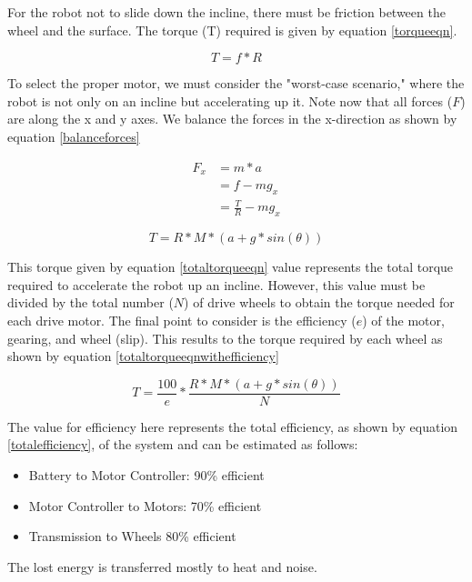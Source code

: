 For the robot not to slide down the incline, there must be friction between the wheel and the surface. 
The torque (T) required is given by equation \ref{torqueeqn}.

\begin{equation} \label{torqueeqn}
T = f * R
\end{equation}

To select the proper motor, we must consider the "worst-case scenario," where the robot is not only on an incline but accelerating up it.
Note now that all forces ($F$) are along the x and y axes. We balance the forces in the x-direction as shown by equation \ref{balanceforces}

\begin{equation} \label{balanceforces}
\begin{split}
F_x & = m * a  \\
& = f - m g_x \\
& = \frac{T}{R} - m g_x
\end{split}
\end{equation}



\begin{equation} \label{totaltorqueeqn}
T = R * M *( a + g * sin(\theta))
\end{equation}

This torque given by equation \ref{totaltorqueeqn} value represents the total torque required to accelerate the robot up an incline. However, this value must be divided by the total number ($N$) of drive wheels to obtain the torque needed for each drive motor. The final point to consider is the efficiency ($e$) of the motor, gearing, and wheel (slip). This results to the torque required by each wheel as shown by equation \ref{totaltorqueeqnwithefficiency}

\begin{equation} \label{totaltorqueeqnwithefficiency}
T = \frac{100}{e} * \frac{R * M *( a + g * sin(\theta))}{N}
\end{equation}

The value for efficiency here represents the total efficiency, as shown by equation \ref{totalefficiency}, of the system and can be estimated as follows:
\begin{itemize}
    \item Battery to Motor Controller: 90\% efficient
    \item Motor Controller to Motors: 70\% efficient
    \item Transmission to Wheels 80\% efficient
\end{itemize}
The lost energy is transferred mostly to heat and noise.

